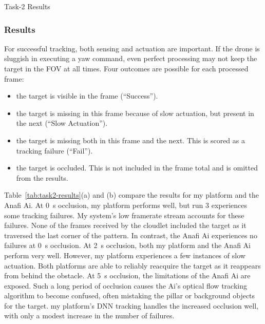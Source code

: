 \begin{table}
\caption{Task-2 Results}
\label{tab:task2-results}
\end{table}

\subsubsection{Results}
\label{sec:task2-results}
For successful tracking, both sensing and actuation are important.  If
the drone is sluggish in executing a yaw command, even perfect
processing may not keep the target in the FOV at all times.
Four outcomes are possible for each processed frame:
\begin{itemize}
	\item{the target is visible in the frame ({\small ``Success''}).}
	
	\item{the target is missing in this frame because of slow actuation, but present in the next ({\small ``Slow Actuation''}).}
	
	\item{the target is missing both in this frame and the next.
		This is scored as a tracking failure ({\small ``Fail''}).}
	
	\item{the target is occluded.
		This is not included in the frame total and is omitted from the results.}
\end{itemize}


Table~\ref{tab:task2-results}(a) and (b) compare the results for my
platform and the Anafi Ai.  At 0~s occlusion, my platform performs
well, but run 3 experiences some tracking failures.  My system's low
framerate stream accounts for these failures.  None of the frames
received by the cloudlet included the target as it traversed the last
corner of the pattern.  In contrast, the Anafi Ai experiences no
failures at 0~s occlusion.  At 2~s occlusion, both my platform and
the Anafi Ai perform very well.  However, my platform experiences a
few instances of slow actuation.  Both platforms are able to reliably
reacquire the target as it reappears from behind the obstacle.  At 5~s
occlusion, the limitations of the Anafi Ai are exposed. Such a long
period of occlusion causes the Ai's optical flow tracking algorithm to
become confused, often mistaking the pillar or background objects for
the target. my platform's DNN tracking handles the increased
occlusion well, with only a modest increase in the number of failures.

